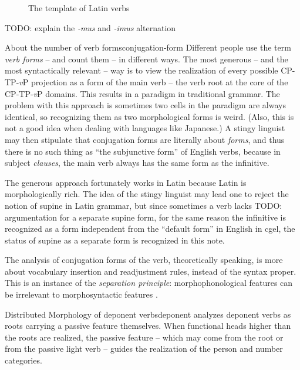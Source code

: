 \documentclass[UTF8, a4paper, oneside]{report}
\newcommand*{\term}[1]{\emph{#1}}
\newcommand{\corpus}[1]{\emph{#1}}
\newcommand{\vP}{\textit{v}P}
\begin{document}
\begin{figure}[H]
    \centering
    
    \caption{The template of Latin verbs}
    \label{fig:latin-verb}
\end{figure}

TODO: explain the \corpus{-mus} and \corpus{-imus} alternation

\begin{theorybox}{About the number of verb forms}{conjugation-form}
    Different people use the term \term{verb forms} -- and count them -- in different ways.
    The most generous -- and the most syntactically relevant -- way 
    is to view the realization of every possible CP-TP-\vP{} projection 
    as a form of the main verb -- the verb root at the core of the CP-TP-\vP{} domains.
    This results in a paradigm in traditional grammar.
    The problem with this approach is sometimes two cells in the paradigm are always identical,
    so recognizing them as two morphological forms is weird.
    (Also, this is not a good idea when dealing with languages like Japanese.)
    A stingy linguist may then stipulate that conjugation forms are literally about \emph{forms},
    and thus there is no such thing as ``the subjunctive form'' of English verbs,
    because in subject \emph{clauses}, 
    the main verb always has the same form as the infinitive.

    The generous approach fortunately works in Latin 
    because Latin is morphologically rich.
    The idea of the stingy linguist may lead one to reject the notion of supine in Latin grammar,
    but since sometimes a verb lacks TODO: argumentation for a separate supine form,
    for the same reason the infinitive is recognized as a form 
    independent from the ``default form'' in English in \acs{cgel},
    the status of supine as a separate form is recognized in this note.

    The analysis of conjugation forms of the verb, theoretically speaking,
    is more about vocabulary insertion and readjustment rules,
    instead of the syntax proper.
    This is an instance of the \emph{separation principle}:
    morphophonological features can be irrelevant to morphosyntactic features
    \citep{embick2000features}.
\end{theorybox}

\begin{theorybox}{Distributed Morphology of deponent verbs}{deponent}
    \citet{embick2000features} analyzes deponent verbs as roots carrying a passive feature themselves.
    When functional heads higher than the roots are realized,
    the passive feature -- which may come from the root or from the passive light verb -- 
    guides the realization of the person and number categories.
\end{theorybox}
\end{document}
